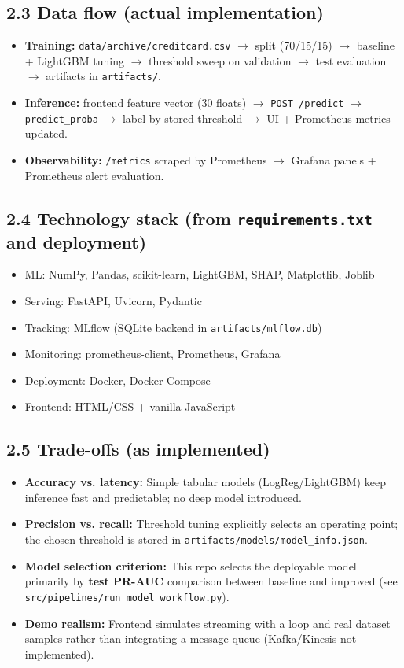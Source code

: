\documentclass[11pt]{article}
\newcommand{\code}[1]{\texttt{#1}}
\begin{document}
\subsection*{2.3 Data flow (actual implementation)}
\begin{itemize}
  \item \textbf{Training:} \code{data/archive/creditcard.csv} \(\rightarrow\) split (70/15/15) \(\rightarrow\) baseline + LightGBM tuning \(\rightarrow\) threshold sweep on validation \(\rightarrow\) test evaluation \(\rightarrow\) artifacts in \code{artifacts/}.
  \item \textbf{Inference:} frontend feature vector (30 floats) \(\rightarrow\) \code{POST /predict} \(\rightarrow\) \code{predict\_proba} \(\rightarrow\) label by stored threshold \(\rightarrow\) UI + Prometheus metrics updated.
  \item \textbf{Observability:} \code{/metrics} scraped by Prometheus \(\rightarrow\) Grafana panels + Prometheus alert evaluation.
\end{itemize}

\subsection*{2.4 Technology stack (from \code{requirements.txt} and deployment)}
\begin{itemize}
  \item ML: NumPy, Pandas, scikit-learn, LightGBM, SHAP, Matplotlib, Joblib
  \item Serving: FastAPI, Uvicorn, Pydantic
  \item Tracking: MLflow (SQLite backend in \code{artifacts/mlflow.db})
  \item Monitoring: prometheus-client, Prometheus, Grafana
  \item Deployment: Docker, Docker Compose
  \item Frontend: HTML/CSS + vanilla JavaScript
\end{itemize}

\subsection*{2.5 Trade-offs (as implemented)}
\begin{itemize}
  \item \textbf{Accuracy vs. latency:} Simple tabular models (LogReg/LightGBM) keep inference fast and predictable; no deep model introduced.
  \item \textbf{Precision vs. recall:} Threshold tuning explicitly selects an operating point; the chosen threshold is stored in \code{artifacts/models/model\_info.json}.
  \item \textbf{Model selection criterion:} This repo selects the deployable model primarily by \textbf{test PR-AUC} comparison between baseline and improved (see \code{src/pipelines/run\_model\_workflow.py}).
  \item \textbf{Demo realism:} Frontend simulates streaming with a loop and real dataset samples rather than integrating a message queue (Kafka/Kinesis not implemented).
\end{itemize}
\end{document}
